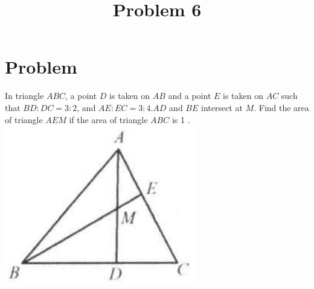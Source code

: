 \documentclass{article}
\title{Problem 6}
\date{}
\begin{document}
\maketitle

\section*{Problem}
In triangle \(A B C\), a point \(D\) is taken on \(A B\) and a point \(E\) is taken on \(A C\) such that \(B D: D C=3: 2\), and \(A E: E C=3: 4 . A D\) and \(B E\) intersect at \(M\). Find the area of triangle \(A E M\) if the area of triangle \(A B C\) is 1 .\\
\centering
\includegraphics[width=\textwidth]{images/problem_image_1.jpg}
\end{document}
